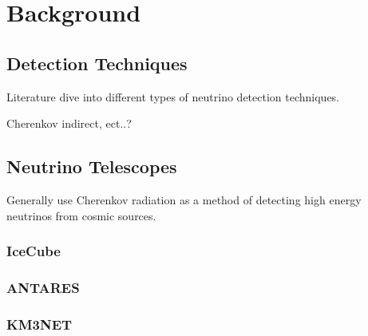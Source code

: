 \chapter{Background}\label{ch:Background}

\section{Detection Techniques}

Literature dive into different types of neutrino detection techniques.

Cherenkov indirect, ect..?

\section{Neutrino Telescopes}

Generally use Cherenkov radiation as a method of detecting high energy neutrinos from cosmic sources.

\subsection{IceCube}

\subsection{ANTARES}

\subsection{KM3NET}
